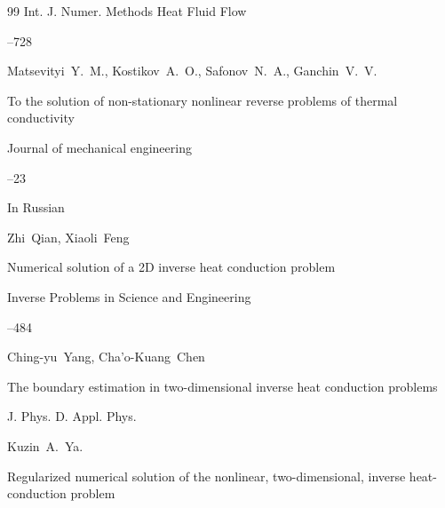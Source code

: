 \begin{thebibliography}{99}
\jour  Int. J. Numer. Methods Heat Fluid Flow



--728





\by Matsevityi~Y.~M., Kostikov~A.~O., Safonov~N.~A., Ganchin~V.~V.

\paper To the solution of non-stationary nonlinear reverse problems of thermal conductivity

\jour Journal of mechanical engineering




--23

\lang In Russian




\by Zhi~Qian, Xiaoli~Feng

\paper Numerical solution of a 2D inverse heat conduction problem

\jour Inverse Problems in Science and Engineering




--484





\by Ching-yu~Yang, Cha'o-Kuang~Chen

\paper The boundary estimation in two-dimensional inverse heat conduction problems

\jour J. Phys. D. Appl. Phys.









\by Kuzin~A.~Ya.

\paper Regularized numerical solution of the nonlinear, two-dimensional, inverse heat-conduction problem


\end{thebibliography}
